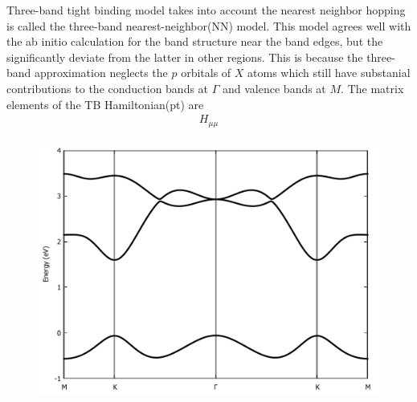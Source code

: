 \documentclass{report}
\begin{document}
Three-band tight binding model takes into account the nearest neighbor hopping is called the three-band nearest-neighbor(NN) model. This model agrees well with the ab initio calculation for the band structure near the band edges, but the significantly deviate from the latter in other regions. This is because the three-band approximation neglects the $p$ orbitals of $X$ atoms which still have substanial contributions to the conduction bands at $\Gamma$ and valence bands at $M$. The matrix elements of the TB Hamiltonian(pt) are
\begin{equation}
	\begin{aligned}
		H_{\mu\mu}
	\end{aligned}
\end{equation}
\begin{figure}
	\centering
	\includegraphics[width=0.65\linewidth,height=0.5\linewidth]{pic/bandstructure.pdf}
	\caption{\label{band structure}}
\end{figure}
\end{document}
